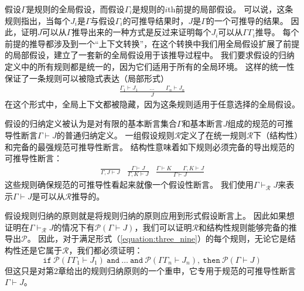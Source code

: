 假设$ \Gamma $是规则的全局假设，而假设$ \Gamma_i $是规则的$ i $th前提的局部假设。
可以说，这条规则指出，当每个$ J_i $是$ \Gamma $与假设$ \Gamma_i $的可推导结果时，$ J $是$ \Gamma $的一个可推导的结果。
因此，证明$ J $可以从$ \Gamma $推导出来的一种方式是反过来证明每个$ J_i $可以从$ \Gamma \Gamma_i $推导。
每个前提的推导都涉及到一个“上下文转换”，在这个转换中我们用全局假设扩展了前提的局部假设，建立了一套新的全局假设用于该推导过程中。
我们要求假设的归纳定义中的所有规则都是统一的，因为它们适用于所有的全局环境。
这样的统一性保证了一条规则可以被隐式表达（局部形式）
\begin{equation}
    \begin{aligned}
        \frac{\Gamma_1 \vdash J_1 \qquad \dots \qquad \Gamma_n \vdash J_n}{J}
    \end{aligned}
\end{equation}
在这个形式中，全局上下文都被隐藏，因为这条规则适用于任意选择的全局假设。

假设的归纳定义被认为是对有限的基本断言集合$ \Gamma $和基本断言$ J $组成的规范的可推导性断言$ \Gamma \vdash J $的普通归纳定义。
一组假设规则$ \mathcal{R} $定义了在统一规则$ \mathcal{R} $下（结构性）和完备的最强规范可推导性断言。
结构性意味着如下规则必须完备的导出规范的可推导性断言：
\begin{subequations}
    \begin{align}
        \frac{}{\Gamma,J\vdash J} \label{equation:three_eleven_a}
    \end{align}
    \begin{align}
        \frac{\Gamma \vdash J}{\Gamma,K\vdash J} \label{equation:three_eleven_b}
    \end{align}
    \begin{align}
        \frac{\Gamma \vdash K \qquad \Gamma,K\vdash J}{\Gamma\vdash J} \label{equation:three_eleven_c}
    \end{align}
\end{subequations}
这些规则确保规范的可推导性看起来就像一个假设性断言。
我们使用$\Gamma \vdash_{\mathcal{R}} J$来表示$\Gamma \vdash J$是可以从$\mathcal{R}$推导的。

假设规则归纳的原则就是将规则归纳的原则应用到形式假设断言上。
因此如果想证明在$\Gamma \vdash_{\mathcal{R}} J$的情况下有$\mathcal{P}(\Gamma \vdash J)$，我们可以证明$\mathcal{R}$和结构性规则能够完备的推导出$\mathcal{P}$。
因此，对于满足形式（\ref{equation:three_nine}）的每个规则，无论它是结构性还是它属于$ \mathcal{R} $，我们都必须证明：
$$\mathtt{if} \  \mathcal{P}(\Gamma \Gamma_1 \vdash J_1) \ \mathtt{and} \ \dots \ \mathtt{and} \ \mathcal{P}(\Gamma \Gamma_n \vdash J_n), \ \mathtt{then} \ \mathcal{P}(\Gamma \vdash J)$$
但这只是对第2章给出的规则归纳原则的一个重申，它专用于规范的可推导性断言$ \Gamma \vdash J $。


